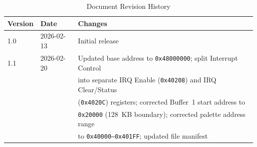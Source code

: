 \documentclass[11pt,letterpaper]{report}
\begin{document}
\begin{table}[tbp]
\centering
\caption{Document Revision History}
\label{tab:revisions}
\begin{tabular}{lll}
\toprule
\textbf{Version} & \textbf{Date} & \textbf{Changes} \\
\midrule
1.0 & 2026-02-13 & Initial release \\
1.1 & 2026-02-20 & Updated base address to \texttt{0x48000000}; split Interrupt Control \\
    &            & into separate IRQ Enable (\texttt{0x40208}) and IRQ Clear/Status \\
    &            & (\texttt{0x4020C}) registers; corrected Buffer~1 start address to \\
    &            & \texttt{0x20000} (128~KB boundary); corrected palette address range \\
    &            & to \texttt{0x40000--0x401FF}; updated file manifest \\
\bottomrule
\end{tabular}
\end{table}
\end{document}
